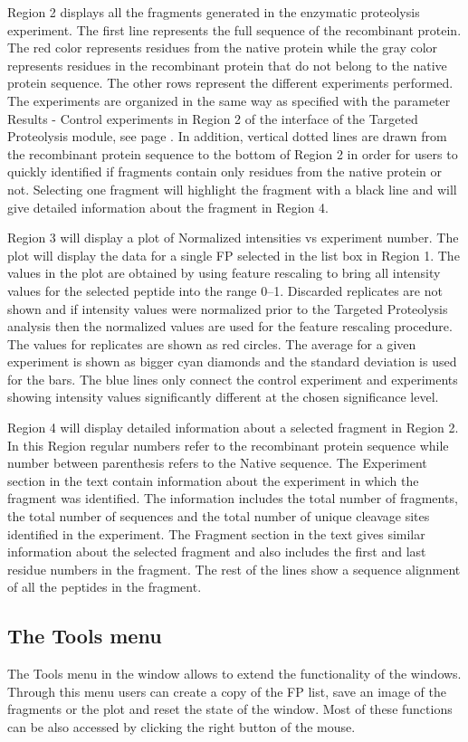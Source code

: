 Region \num{2} displays all the fragments generated in the enzymatic proteolysis experiment. The first line represents the full sequence of the recombinant protein. The red color represents residues from the native protein while the gray color represents residues in the recombinant protein that do not belong to the native protein sequence. The other rows represent the different experiments performed. The experiments are organized in the same way as specified with the parameter Results - Control experiments in Region \num{2} of the interface of the Targeted Proteolysis module, see page \pageref{par:tarprotResultControl}. In addition, vertical dotted lines are drawn from the recombinant protein sequence to the bottom of Region \num{2} in order for users to quickly identified if fragments contain only residues from the native protein or not. Selecting one fragment will highlight the fragment with a black line and will give detailed information about the fragment in Region \num{4}. 

Region \num{3} will display a plot of Normalized intensities vs experiment number. The plot will display the data for a single FP selected in the list box in Region \num{1}. The values in the plot are obtained by using feature rescaling to bring all intensity values for the selected peptide into the range \numrange{0}{1}. Discarded replicates are not shown and if intensity values were normalized prior to the Targeted Proteolysis analysis then the normalized values are used for the feature rescaling procedure. The values for replicates are shown as red circles. The average for a given experiment is shown as bigger cyan diamonds and the standard deviation is used for the bars. The blue lines only connect the control experiment and experiments showing intensity values significantly different at the chosen significance level.  

Region \num{4} will display detailed information about a selected fragment in Region \num{2}. In this Region regular numbers refer to the recombinant protein sequence while number between parenthesis refers to the Native sequence. The Experiment section in the text contain information about the experiment in which the fragment was identified. The information includes the total number of fragments, the total number of sequences and the total number of unique cleavage sites identified in the experiment. The Fragment section in the text gives similar information about the selected fragment and also includes the first and last residue numbers in the fragment. The rest of the lines show a sequence alignment of all the peptides in the fragment.

\subsection{The Tools menu}

The Tools menu in the window allows to extend the functionality of the windows. Through this menu users can create a copy of the FP list, save an image of the fragments or the plot and reset the state of the window. Most of these functions can be also accessed by clicking the right button of the mouse.